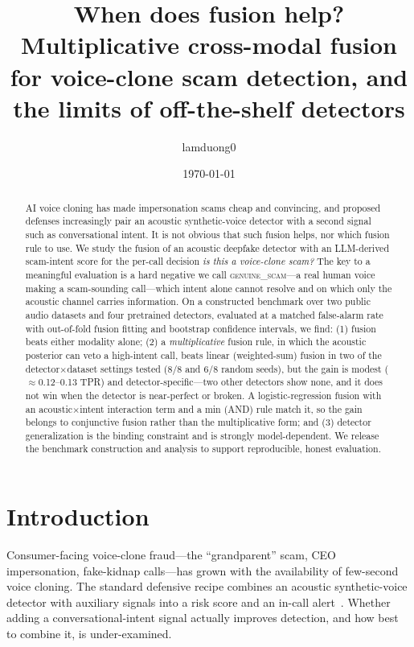 \documentclass[11pt]{article}
\title{When does fusion help? Multiplicative cross-modal fusion for
voice-clone scam detection, and the limits of off-the-shelf detectors}
\author{lamduong0}
\date{\today}
\begin{document}
\maketitle

\begin{abstract}
AI voice cloning has made impersonation scams cheap and convincing, and proposed defenses
increasingly pair an acoustic synthetic-voice detector with a second signal such as
conversational intent. It is not obvious that such fusion helps, nor which fusion rule to
use. We study the fusion of an acoustic deepfake detector with an LLM-derived scam-intent
score for the per-call decision \emph{is this a voice-clone scam?} The key to a meaningful
evaluation is a hard negative we call \textsc{genuine\_scam}---a real human voice making a
scam-sounding call---which intent alone cannot resolve and on which only the acoustic
channel carries information. On a constructed benchmark over two public audio datasets and
four pretrained detectors, evaluated at a matched false-alarm rate with out-of-fold fusion
fitting and bootstrap confidence intervals, we find: (1) fusion beats either modality
alone; (2) a \emph{multiplicative} fusion rule, in which the acoustic posterior can veto a
high-intent call, beats linear (weighted-sum) fusion in two of the detector$\times$dataset
settings tested (8/8 and 6/8 random seeds), but the gain is modest
($\approx$0.12--0.13 TPR) and detector-specific---two other detectors show none, and it
does not win when the detector is near-perfect or broken. A logistic-regression fusion
with an acoustic$\times$intent interaction term and a min (AND) rule match it, so the gain
belongs to conjunctive fusion rather than the multiplicative form; and (3) detector
generalization is the binding constraint and is strongly model-dependent. We release the
benchmark construction and analysis to support reproducible, honest evaluation.
\end{abstract}

\section{Introduction}
Consumer-facing voice-clone fraud---the ``grandparent'' scam, CEO impersonation,
fake-kidnap calls---has grown with the availability of few-second voice cloning. The
standard defensive recipe combines an acoustic synthetic-voice detector with auxiliary
signals into a risk score and an in-call alert~\cite{us12284313,us10455085,us9692885}.
Whether adding a conversational-intent signal actually improves detection, and how best to
combine it, is under-examined.
\end{document}
